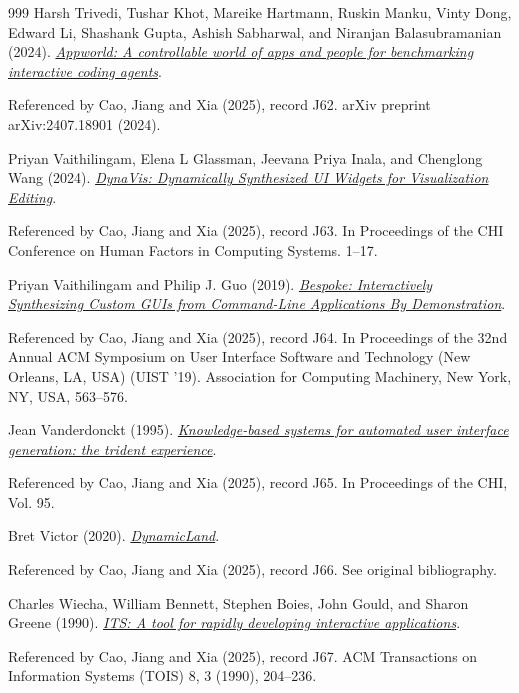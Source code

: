 \documentclass[11pt,letterpaper]{article}
\begin{document}
\begin{thebibliography}{999}
Harsh Trivedi, Tushar Khot, Mareike Hartmann, Ruskin Manku, Vinty Dong, Edward Li, Shashank Gupta, Ashish Sabharwal, and Niranjan Balasubramanian (2024).
\href{https://arxiv.org/abs/2407.18901}{\emph{Appworld: A controllable world of apps and people for benchmarking interactive coding agents}}.
\par {\small Referenced by Cao, Jiang and Xia (2025), record J62. arXiv preprint arXiv:2407.18901 (2024).}

Priyan Vaithilingam, Elena L Glassman, Jeevana Priya Inala, and Chenglong Wang (2024).
\href{https://www.microsoft.com/en-us/research/publication/dynavis-dynamically-synthesized-ui-widgets-for-visualization-editing/}{\emph{DynaVis: Dynamically Synthesized UI Widgets for Visualization Editing}}.
\par {\small Referenced by Cao, Jiang and Xia (2025), record J63. In Proceedings of the CHI Conference on Human Factors in Computing Systems. 1–17.}

Priyan Vaithilingam and Philip J. Guo (2019).
\href{https://doi.org/10.1145/3332165.3347944}{\emph{Bespoke: Interactively Synthesizing Custom GUIs from Command-Line Applications By Demonstration}}.
\par {\small Referenced by Cao, Jiang and Xia (2025), record J64. In Proceedings of the 32nd Annual ACM Symposium on User Interface Software and Technology (New Orleans, LA, USA) (UIST ’19). Association for Computing Machinery, New York, NY, USA, 563–576.}

Jean Vanderdonckt (1995).
\href{https://arxiv.org/html/2503.04084v1\#bib.bib66}{\emph{Knowledge-based systems for automated user interface generation: the trident experience}}.
\par {\small Referenced by Cao, Jiang and Xia (2025), record J65. In Proceedings of the CHI, Vol. 95.}

Bret Victor (2020).
\href{https://dynamicland.org/}{\emph{DynamicLand}}.
\par {\small Referenced by Cao, Jiang and Xia (2025), record J66. See original bibliography.}

Charles Wiecha, William Bennett, Stephen Boies, John Gould, and Sharon Greene (1990).
\href{https://research.ibm.com/publications/its-a-tool-for-rapidly-developing-interactive-applications}{\emph{ITS: A tool for rapidly developing interactive applications}}.
\par {\small Referenced by Cao, Jiang and Xia (2025), record J67. ACM Transactions on Information Systems (TOIS) 8, 3 (1990), 204–236.}


\end{thebibliography}
\end{document}
